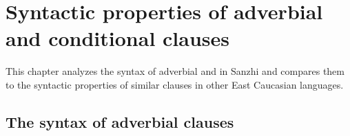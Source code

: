 \chapter{Syntactic properties of adverbial and conditional clauses}
\label{cpt:Syntactic properties of adverbial and \isi{conditional} clauses}

This chapter analyzes the syntax of adverbial and  in Sanzhi and compares them to the syntactic properties of similar clauses in other East Caucasian languages.



\section{The syntax of adverbial clauses}
\label{sec:The syntax of adverbial clauses}

